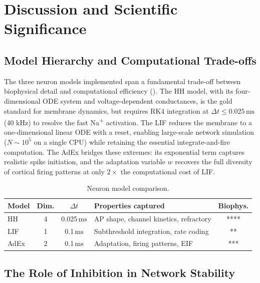 \documentclass[11pt, a4paper, twocolumn]{article}
\newcommand{\ms}{\ensuremath{\,\mathrm{ms}}}
\begin{document}
\section{Discussion and Scientific Significance}
\label{sec:discussion}

\subsection{Model Hierarchy and Computational Trade-offs}

The three neuron models implemented span a fundamental trade-off between
biophysical detail and computational efficiency ().
The HH model, with its four-dimensional ODE system and voltage-dependent
conductances, is the gold standard for membrane dynamics, but requires RK4
integration at $\Delta t \leq 0.025\ms$ (40 kHz) to resolve the fast
Na\textsuperscript{+} activation. The LIF reduces the membrane to a
one-dimensional linear ODE with a reset, enabling large-scale network
simulation ($N \sim 10^5$ on a single CPU) while retaining the essential
integrate-and-fire computation. The AdEx bridges these extremes: its
exponential term captures realistic spike initiation, and the adaptation
variable $w$ recovers the full diversity of cortical firing patterns at
only $2\times$ the computational cost of LIF.

\begin{table}[H]
\centering
\small
\caption{Neuron model comparison.}
\label{tab:model_comparison}
\begin{tabularx}{\columnwidth}{lccXc}
\toprule
\textbf{Model} & \textbf{Dim.} & \boldmath$\Delta t$ & \textbf{Properties captured} & \textbf{Biophys.} \\
\midrule
HH  & 4 & 0.025\ms & AP shape, channel kinetics, refractory & **** \\
LIF & 1 & 0.1\ms & Subthreshold integration, rate coding & ** \\
AdEx & 2 & 0.1\ms & Adaptation, firing patterns, EIF & *** \\
\bottomrule
\end{tabularx}
\end{table}

\subsection{The Role of Inhibition in Network Stability}
\end{document}
